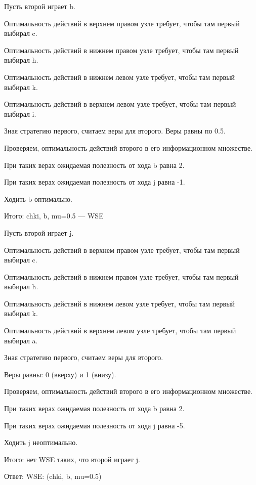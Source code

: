 \begin{solution}{6.89}
Пусть второй играет b. \par
Оптимальность действий в верхнем правом узле требует, чтобы там первый выбирал c.\par
Оптимальность действий в нижнем правом узле требует, чтобы там первый выбирал h.\par
Оптимальность действий в нижнем левом узле требует, чтобы там первый выбирал k.\par
Оптимальность действий в верхнем левом узле требует, чтобы там первый выбирал i.\par
Зная стратегию первого, считаем веры для второго. Веры равны по 0.5.\par
Проверяем, оптимальность действий второго в его информационном множестве.\par
При таких верах ожидаемая полезность от хода b равна 2.\par
При таких верах ожидаемая полезность от хода j равна -1.\par
Ходить b оптимально.\par
Итого: chki, b, mu=0.5 --- WSE\par
Пусть второй играет j. \par
Оптимальность действий в верхнем правом узле требует, чтобы там первый выбирал c.\par
Оптимальность действий в нижнем правом узле требует, чтобы там первый выбирал h.\par
Оптимальность действий в нижнем левом узле требует, чтобы там первый выбирал k.\par
Оптимальность действий в верхнем левом узле требует, чтобы там первый выбирал a.\par
Зная стратегию первого, считаем веры для второго. \par
Веры равны: 0 (вверху) и 1 (внизу).\par
Проверяем, оптимальность действий второго в его информационном множестве.\par
При таких верах ожидаемая полезность от хода b равна 2.\par
При таких верах ожидаемая полезность от хода j равна -5.\par
Ходить j неоптимально.\par
Итого: нет WSE таких, что второй играет j.\par
Ответ: WSE: (chki, b, mu=0.5)
\end{solution}
\begin{solution}{6.90}

\end{solution}
